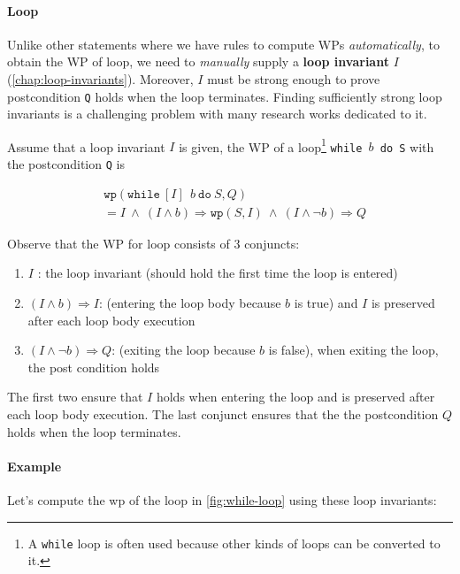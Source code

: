 \documentclass[oneside,11pt,dvipsnames]{book}
\renewcommand{\implies}{\Rightarrow}
\newcommand{\code}[1]{\texttt{#1}}
\begin{document}
\paragraph{Loop}

Unlike other statements where we have rules to compute WPs \emph{automatically}, to obtain the WP of loop, we need to \emph{manually} supply a \textbf{loop invariant} $I$ (\autoref{chap:loop-invariants}). Moreover, $I$ must be strong enough to prove postcondition \code{Q} holds when the loop terminates. Finding sufficiently strong loop invariants is a challenging problem with many research works dedicated to it.

Assume that a loop invariant $I$ is given, the WP of a loop\footnote{A \code{while} loop is often used because other kinds of loops can be converted to it.} \code{while $b$ do S} with the postcondition \code{Q} is

\begin{equation}
    \begin{split}
    & \code{wp}(\code{while} ~[I]~ ~b~ \code{do} ~S, Q) \\
    &=    I  ~\land~   (I \land b) \implies \code{wp}(S,I)  ~\land~ (I \land \neg b)  \implies Q
    \end{split}   
\end{equation}

Observe that the WP for loop consists of 3 conjuncts:
\begin{enumerate}
\item $I$ : the loop invariant (should hold the first time the loop is entered)
\item $(I \land b) \implies I$: (entering the loop body because $b$ is true) and $I$ is preserved after each loop body execution
\item $(I \land \neg b) \implies Q$: (exiting the loop because $b$ is false), when exiting the loop, the post condition holds
\end{enumerate}

The first two ensure that $I$ holds when entering the loop and is preserved after each loop body execution. The last conjunct ensures that the the postcondition $Q$ holds when the loop terminates.

\paragraph{Example}


Let's compute the wp of the loop in \autoref{fig:while-loop} using these loop invariants: 
\end{document}
